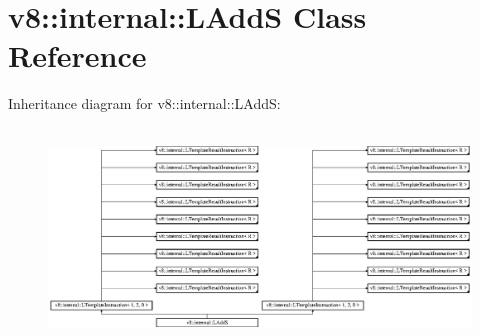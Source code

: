 \hypertarget{classv8_1_1internal_1_1_l_add_s}{}\section{v8\+:\+:internal\+:\+:L\+AddS Class Reference}
\label{classv8_1_1internal_1_1_l_add_s}
Inheritance diagram for v8\+:\+:internal\+:\+:L\+AddS\+:\begin{figure}[H]
\begin{center}
\leavevmode
\includegraphics[height=5.724907cm]{classv8_1_1internal_1_1_l_add_s}
\end{center}
\end{figure}
